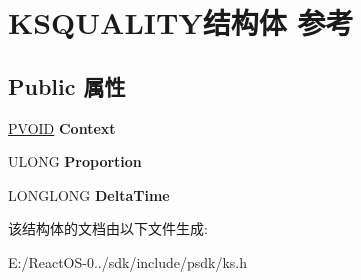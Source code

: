 \hypertarget{struct_k_s_q_u_a_l_i_t_y}{}\section{K\+S\+Q\+U\+A\+L\+I\+T\+Y结构体 参考}
\label{struct_k_s_q_u_a_l_i_t_y}
\subsection*{Public 属性}
\begin{DoxyCompactItemize}
\item 
\mbox{\label{struct_k_s_q_u_a_l_i_t_y_a78ad5d8aeec2034ba2c4b5e6d23f6f30}} 
\hyperlink{interfacevoid}{P\+V\+O\+ID} {\bfseries Context}
\item 
\mbox{\label{struct_k_s_q_u_a_l_i_t_y_a93fadff43ac8b64a5d19c6eb8f347b85}} 
U\+L\+O\+NG {\bfseries Proportion}
\item 
\mbox{\label{struct_k_s_q_u_a_l_i_t_y_a5312a7a9566d31f658196afcbe90ae14}} 
L\+O\+N\+G\+L\+O\+NG {\bfseries Delta\+Time}
\end{DoxyCompactItemize}


该结构体的文档由以下文件生成\+:\begin{DoxyCompactItemize}
\item 
E\+:/\+React\+O\+S-\/0../sdk/include/psdk/ks.\+h\end{DoxyCompactItemize}

